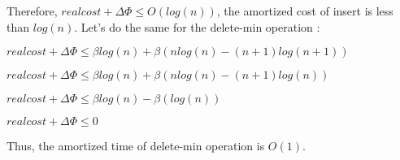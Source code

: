 Therefore, $real cost + \Delta\Phi \leqslant O(log(n))$, the amortized cost of insert is less than $log(n)$.
Let's do the same for the delete-min operation :

$real cost + \Delta\Phi \leqslant \beta log(n) + \beta(nlog(n)-(n+1)log(n+1))$

$real cost + \Delta\Phi \leqslant \beta log(n) + \beta(nlog(n)-(n+1)log(n))$

$real cost + \Delta\Phi \leqslant \beta log(n) - \beta(log(n))$

$real cost + \Delta\Phi \leqslant 0$

Thus, the amortized time of delete-min operation is $O(1)$.
